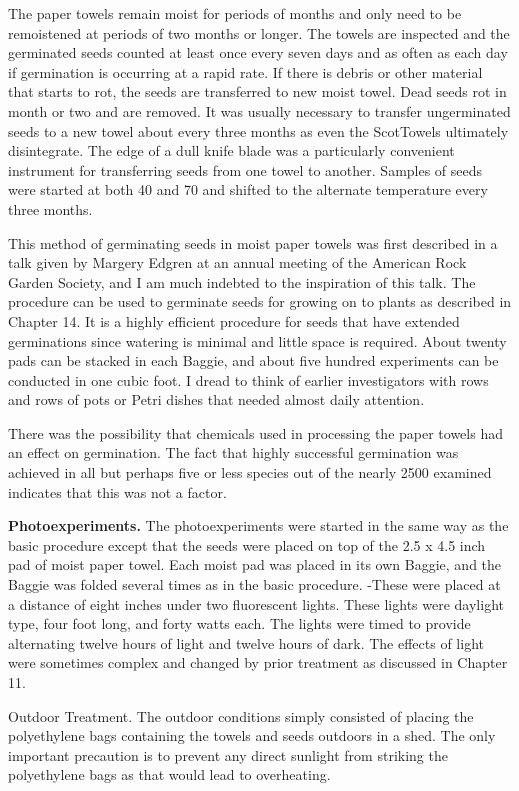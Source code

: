 The paper towels remain moist for periods of months and only need to be
remoistened at periods of two months or longer. The towels are inspected and the
germinated seeds counted at least once every seven days and as often as each day if
germination is occurring at a rapid rate. If there is debris or other material that starts to
rot, the seeds are transferred to new moist towel. Dead seeds rot in month or two
and are removed. It was usually necessary to transfer ungerminated seeds to a new
towel about every three months as even the ScotTowels ultimately disintegrate. The
edge of a dull knife blade was a particularly convenient instrument for transferring
seeds from one towel to another. Samples of seeds were started at both 40 and 70
and shifted to the alternate temperature every three months.

This method of germinating seeds in moist paper towels was first described in a
talk given by Margery Edgren at an annual meeting of the American Rock Garden
Society, and I am much indebted to the inspiration of this talk. The procedure can be
used to germinate seeds for growing on to plants as described in Chapter 14. It is a
highly efficient procedure for seeds that have extended germinations since watering is
minimal and little space is required. About twenty pads can be stacked in each
Baggie, and about five hundred experiments can be conducted in one cubic foot. I
dread to think of earlier investigators with rows and rows of pots or Petri dishes that
needed almost daily attention.

There was the possibility that chemicals used in processing the paper towels
had an effect on germination. The fact that highly successful germination was
achieved in all but perhaps five or less species out of the nearly 2500 examined
indicates that this was not a factor.

\textbf{Photoexperiments.} The photoexperiments were started in the same way as
the basic procedure except that the seeds were placed on top of the 2.5 x 4.5 inch pad
of moist paper towel. Each moist pad was placed in its own Baggie, and the Baggie
was folded several times as in the basic procedure. -These were placed at a distance
of eight inches under two fluorescent lights. These lights were daylight type, four foot
long, and forty watts each. The lights were timed to provide alternating twelve hours of
light and twelve hours of dark. The effects of light were sometimes complex and
changed by prior treatment as discussed in Chapter 11.

Outdoor Treatment. The outdoor conditions simply consisted of placing the
polyethylene bags containing the towels and seeds outdoors in a shed. The only
important precaution is to prevent any direct sunlight from striking the polyethylene
bags as that would lead to overheating.

